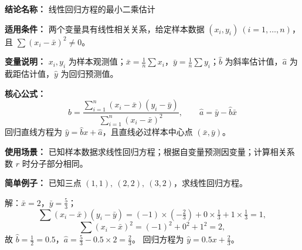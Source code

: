 \textbf{结论名称：} 线性回归方程的最小二乘估计

\textbf{适用条件：} 两个变量具有线性相关关系，给定样本数据 $(x_i, y_i)\ (i=1,\dots,n)$，且 $\sum (x_i-\bar{x})^2 \neq 0$。

\textbf{变量说明：} $x_i, y_i$ 为样本观测值；$\bar{x}=\frac{1}{n}\sum x_i$，$\bar{y}=\frac{1}{n}\sum y_i$；$\hat{b}$ 为斜率估计值，$\hat{a}$ 为截距估计值，$\hat{y}$ 为回归预测值。

\textbf{核心公式：}
\[
\boxed{\hat{b} = \frac{\sum_{i=1}^{n} (x_i - \bar{x})(y_i - \bar{y})}{\sum_{i=1}^{n} (x_i - \bar{x})^2}, \qquad \hat{a} = \bar{y} - \hat{b}\bar{x}}
\]
回归直线方程为 $\hat{y} = \hat{b}x + \hat{a}$，且直线必过样本中心点 $(\bar{x}, \bar{y})$。

\textbf{使用场景：} 已知样本数据求线性回归方程；根据自变量预测因变量；计算相关系数 $r$ 时分子部分相同。

\textbf{简单例子：} 已知三点 $(1,1),\ (2,2),\ (3,2)$，求线性回归方程。

解：$\bar{x}=2$，$\bar{y}=\frac{5}{3}$；
\[
\sum (x_i-\bar{x})(y_i-\bar{y}) = (-1)\times(-\tfrac{2}{3}) + 0\times\tfrac{1}{3} + 1\times\tfrac{1}{3} = 1,
\]
\[
\sum (x_i-\bar{x})^2 = (-1)^2 + 0^2 + 1^2 = 2,
\]
故 $\hat{b} = \frac{1}{2} = 0.5$，$\hat{a} = \frac{5}{3} - 0.5\times 2 = \frac{2}{3}$。
回归方程为 $\hat{y} = 0.5x + \frac{2}{3}$。